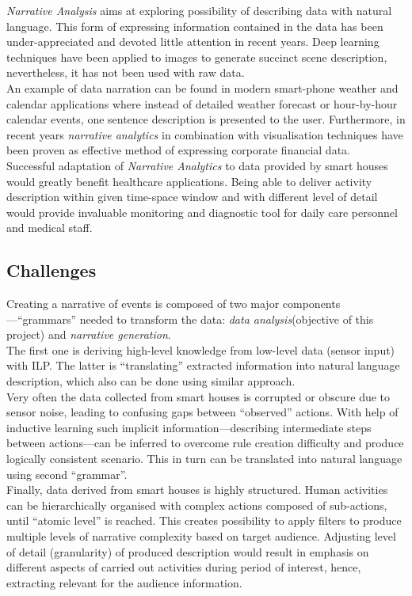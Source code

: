 \documentclass[12pt, a4paper, pdflatex, leqno, twoside]{report}
\begin{document}
\emph{Narrative Analysis} aims at exploring possibility of describing data with natural language. This form of expressing information contained in the data has been under-appreciated and devoted little attention in recent years. Deep learning techniques have been applied to images to generate succinct scene description, nevertheless, it has not been used with raw data.\\
An example of data narration can be found in modern smart-phone weather and calendar applications where instead of detailed weather forecast or hour-by-hour calendar events, one sentence description is presented to the user. Furthermore, in recent years \emph{narrative analytics} in combination with visualisation techniques have been proven as effective method of expressing corporate financial data.\\

Successful adaptation of \emph{Narrative Analytics} to data provided by smart houses would greatly benefit healthcare applications. Being able to deliver activity description within given time-space window and with different level of detail would provide invaluable monitoring and diagnostic tool for daily care personnel and medical staff.


  \subsection{Challenges}
Creating a narrative of events is composed of two major components---``grammars'' needed to transform the data: \emph{data analysis}(objective of this project) and \emph{narrative generation}.\\
The first one is deriving high-level knowledge from low-level data (sensor input) with ILP. The latter is ``translating'' extracted information into natural language description, which also can be done using similar approach.\\

Very often the data collected from smart houses is corrupted or obscure due to sensor noise, leading to confusing gaps between ``observed'' actions. With help of inductive learning such implicit information---describing intermediate steps between actions---can be inferred to overcome rule creation difficulty and produce logically consistent scenario. This in turn can be translated into natural language using second ``grammar''.\\

Finally, data derived from smart houses is highly structured. Human activities can be hierarchically organised with complex actions composed of sub-actions, until ``atomic level'' is reached. This creates possibility to apply filters to produce multiple levels of narrative complexity based on target audience. Adjusting level of detail (granularity) of produced description would result in emphasis on different aspects of carried out activities during period of interest, hence, extracting relevant for the audience information.
\end{document}
